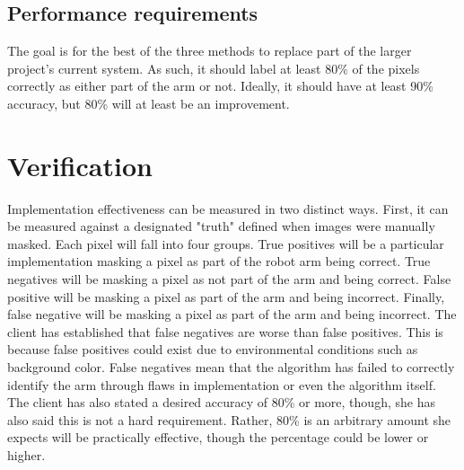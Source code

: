 \documentclass[10pt,journal,compsoc, draftclsnofoot,onecolumn]{IEEEtran}
\begin{document}
\subsection{Performance requirements}
The goal is for the best of the three methods to replace part of the larger project’s current system.
As such, it should label at least 80\% of the pixels correctly as either part of the arm or not.
Ideally, it should have at least 90\% accuracy, but 80\% will at least be an improvement.


\section {Verification}
Implementation effectiveness can be measured in two distinct ways.
First, it can be measured against a designated "truth" defined when images were manually masked.
Each pixel will fall into four groups.
True positives will be a particular implementation masking a pixel as part of the robot arm being correct.
True negatives will be masking a pixel as not part of the arm and being correct.
False positive will be masking a pixel as part of the arm and being incorrect.
Finally, false negative will be masking a pixel as part of the arm and being incorrect.
The client has established that false negatives are worse than false positives.
This is because false positives could exist due to environmental conditions such as background color.
False negatives mean that the algorithm has failed to correctly identify the arm through flaws in implementation or even the algorithm itself.
The client has also stated a desired accuracy of 80\% or more, though, she has also said this is not a hard requirement.
Rather, 80\% is an arbitrary amount she expects will be practically effective, though the percentage could be lower or higher.
\end{document}
